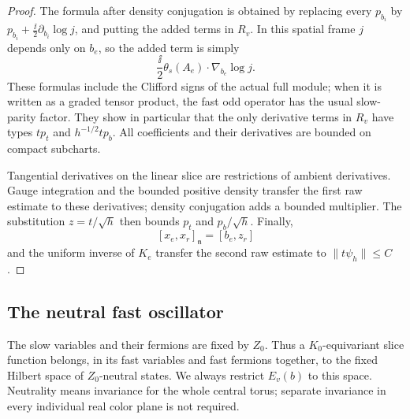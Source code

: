 \begin{proof}
The formula after density conjugation is obtained by replacing every
$p_{b_i}$ by $p_{b_i}+\frac{\ii}{2}\partial_{b_i}\log j$, and putting
the added terms in $R_v$. In this spatial frame $j$ depends only on
$b_e$, so the added term is simply
\begin{equation}
 \frac{\ii}{2}\theta_s(A_e)\cdot\nabla_{b_e}\log j.
 \label{fast:density-term}
\end{equation}
These formulas include the Clifford signs of the actual full module;
when it is written as a graded tensor product, the fast odd operator
has the usual slow-parity factor. They show in particular that the
only derivative terms in $R_v$ have types $t p_t$ and
$h^{-1/2}t p_b$. All coefficients and their derivatives are bounded on
compact subcharts.

Tangential derivatives on the linear slice are restrictions of
ambient derivatives. Gauge integration and the bounded positive
density transfer the first raw estimate to these derivatives; density
conjugation adds a bounded multiplier. The substitution $z=t/\sqrt h$
then bounds $p_t$ and $p_b/\sqrt h$. Finally,
\[
 [x_e,x_r]_{\mathfrak n}=[b_e,z_r]
\]
and the uniform inverse of $K_e$ transfer the second raw estimate to
$\|t\psi_h\|\leq C$.
\end{proof}

\subsection{The neutral fast oscillator}

The slow variables and their fermions are fixed by $Z_0$. Thus a
$K_0$-equivariant slice function belongs, in its fast variables and
fast fermions together, to the fixed Hilbert space of $Z_0$-neutral
states. We always restrict $E_v(b)$ to this space. Neutrality means
invariance for the whole central torus; separate invariance in every
individual real color plane is not required.

